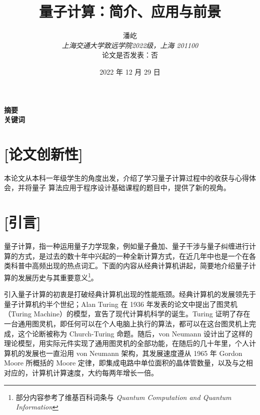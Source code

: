 \documentclass[a4paper,11pt,onecolumn,twoside]{article}
\title{\textbf{量子计算：简介、应用与前景}}
\author{
潘屹
\\[2pt]
{\small \textit{上海交通大学致远学院2022级，上海 201100}}\\[6pt]
论文是否发表：否\\[2pt]
}
\date{2022 年 12 月 29 日}%
\begin{document}
\maketitle
\thispagestyle{firststyle}
\setlength{\oddsidemargin}{ 1cm}
\setlength{\evensidemargin}{\oddsidemargin}
\setlength{\textwidth}{15.50cm}
\vspace{-.8cm}
\begin{center}
    \parbox{\textwidth}{
        \textbf{摘要}  \\

        \textbf{关键词}}
\end{center}

\setcounter{page}{1}

\setlength{\oddsidemargin}{-.5cm}  %
\setlength{\evensidemargin}{\oddsidemargin}
\setlength{\textwidth}{17.00cm}

\section*{[论文创新性]}
本论文从本科一年级学生的角度出发，介绍了学习量子计算过程中的收获与心得体会，并将量子
算法应用于程序设计基础课程的题目中，提供了新的视角。

\section*{[引言]}

量子计算，指一种运用量子力学现象，例如量子叠加、量子干涉与量子纠缠进行计算的方式，是过去的数十年中兴起的一种全新计算方式，在近几年中也是一个在各类科普中高频出现的热点词汇。下面的内容从经典计算机讲起，简要地介绍量子计算的发展历史与其重要意义\footnote{部分内容参考了维基百科词条与 \textit{Quantum Computation and Quantum Information}\cite{nielsen2002quantum}}。

引入量子计算的初衷是打破经典计算机出现的性能瓶颈。经典计算机的发展领先于量子计算机约半个世纪；Alan Turing 在 1936 年发表的论文中提出了图灵机（Turing Machine）的模型\cite{turing1936computable}，宣告了现代计算机科学的诞生。Turing 证明了存在一台通用图灵机，即任何可以在个人电脑上执行的算法，都可以在这台图灵机上完成，这个论断被称为 Church-Turing 命题。随后，von Neumann 设计出了这样的理论模型，用实际元件实现了通用图灵机的全部功能，在随后的几十年里，个人计算机的发展也一直沿用 von Neumann 架构，其发展速度遵从 1965 年 Gordon Moore 所概括的 Moore 定律，即集成电路中单位面积的晶体管数量，以及与之相对应的，计算机计算速度，大约每两年增长一倍\cite{moore1965cramming}。
\end{document}
